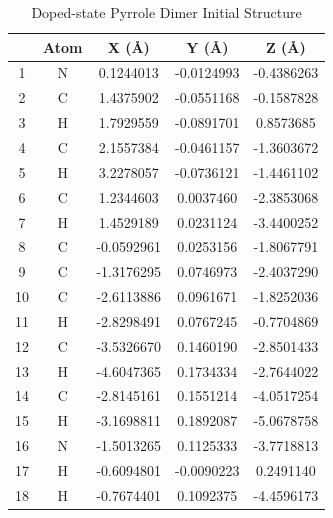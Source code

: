 \begin{table}[hbt!]\centering
\caption{Doped-state Pyrrole Dimer Initial Structure}
\renewcommand{\arraystretch}{1.5}
\begin{threeparttable}
\begin{tabular}{ccccc}\toprule
{} & {Atom} & {X (\AA)} & {Y (\AA)} & {Z (\AA)} \\ \midrule
    1  & N &  0.1244013 & -0.0124993 & -0.4386263\\
    2  & C &  1.4375902 & -0.0551168 & -0.1587828\\
    3  & H &  1.7929559 & -0.0891701 &  0.8573685\\
    4  & C &  2.1557384 & -0.0461157 & -1.3603672\\
    5  & H &  3.2278057 & -0.0736121 & -1.4461102\\
    6  & C &  1.2344603 &  0.0037460 & -2.3853068\\ \midrule
    7  & H &  1.4529189 &  0.0231124 & -3.4400252\\
    8  & C & -0.0592961 &  0.0253156 & -1.8067791\\
    9  & C & -1.3176295 &  0.0746973 & -2.4037290\\
    10 & C & -2.6113886 &  0.0961671 & -1.8252036\\
    11 & H & -2.8298491 &  0.0767245 & -0.7704869\\
    12 & C & -3.5326670 &  0.1460190 & -2.8501433\\ \midrule
    13 & H & -4.6047365 &  0.1734334 & -2.7644022\\
    14 & C & -2.8145161 &  0.1551214 & -4.0517254\\
    15 & H & -3.1698811 &  0.1892087 & -5.0678758\\
    16 & N & -1.5013265 &  0.1125333 & -3.7718813\\
    17 & H & -0.6094801 & -0.0090223 &  0.2491140\\
    18 & H & -0.7674401 &  0.1092375 & -4.4596173\\ \bottomrule
\end{tabular}
\begin{tablenotes}
\item
\end{tablenotes}
\end{threeparttable}
\end{table}

